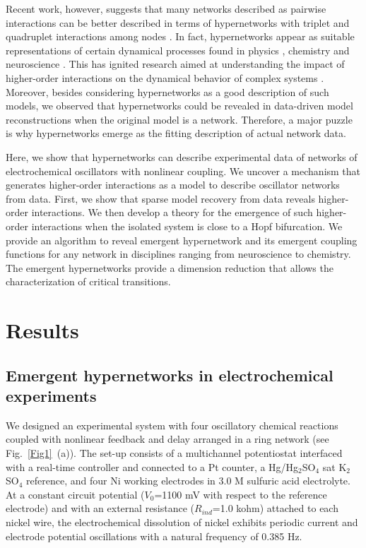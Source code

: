 \documentclass[12pt]{article}
\theoremstyle{plain}
\theoremstyle{definition}
\theoremstyle{remark}
\theoremstyle{remark}
\begin{document}
Recent work, however, suggests that many networks described as pairwise interactions can be better described in terms of hypernetworks with triplet and quadruplet interactions among nodes \cite{RalfNC, giusti2015clique,  reimann2017cliques, bassett2018nature}. In fact, hypernetworks appear as suitable representations of certain dynamical processes found in physics \cite{millan2020explosive,bick2016chaos}, chemistry \cite{kori2014clustering} and neuroscience \cite{giusti2016two,bassett2017network}. This has ignited research aimed at understanding the impact of higher-order interactions on the dynamical behavior of complex systems \cite{grilli2017higher, skardal2019abrupt,mulas2020coupled, bilal2014synchronization}. 
 Moreover, besides considering hypernetworks as a good description of such models, we observed that hypernetworks could be revealed in data-driven model reconstructions when the original model is a network. Therefore,  a major puzzle  is why hypernetworks emerge as the fitting description of actual network data. 


Here, we show that hypernetworks can describe experimental data of networks of electrochemical oscillators with nonlinear coupling. We uncover a mechanism that generates higher-order interactions as a model to describe oscillator networks from data. First, we show that sparse model recovery from data reveals higher-order interactions. We then develop a theory for the emergence of such higher-order interactions when the isolated system is close to a Hopf bifurcation.  
We provide an algorithm to reveal emergent hypernetwork and its emergent coupling functions for any network in disciplines ranging from neuroscience to chemistry. {\color{black} The emergent hypernetworks provide a dimension reduction that allows the characterization of critical transitions. }

\section*{Results}


\subsection*{Emergent hypernetworks in electrochemical experiments} 

We designed an experimental system with four oscillatory chemical reactions coupled with nonlinear feedback and delay arranged in a ring network (see Fig.~\ref{Fig1}~(a)). The set-up consists of a multichannel potentiostat interfaced with a real-time  controller and connected to a Pt counter, a Hg/Hg$_2$SO$_4$ sat K$_2$SO$_4$ reference, and four Ni working electrodes in 3.0 M sulfuric acid electrolyte.  At a constant circuit potential ($V_0$=1100 mV with respect to the reference electrode) and with an external resistance ($R_{ind}$=1.0 kohm) attached to each nickel wire, the electrochemical dissolution of nickel exhibits periodic current and electrode potential oscillations with a natural frequency of 0.385 Hz. 
\end{document}
